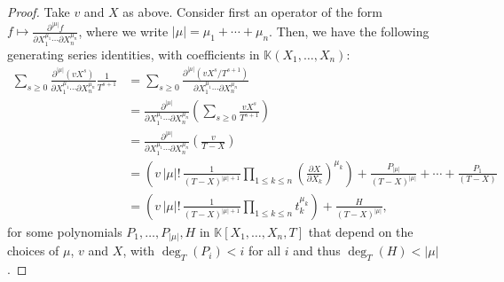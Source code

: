 \documentclass[final,1p,times,authoryear]{elsarticle}
\newcommand{\lf}{X}
\def\K{\mathbb{K}}
\def\K {\ensuremath{\mathbb{K}}}
\begin{document}
\begin{proof}
  Take $v$ and $\lf$ as above. Consider first an operator of the form $f
  \mapsto \frac{ \partial^{|\mu|} f} {\partial X_1^{\mu_1} \cdots
  \partial X_n^{\mu_n}}$, where we write
  $|\mu|=\mu_1+\cdots+\mu_n$. Then, we have the following generating
  series identities, with coefficients in $\K(X_1,\dots,X_n)$:
  \begin{align*}
    \sum_{s \ge 0} 
    \frac{ \partial^{|\mu|} ( v \lf^s )} {\partial X_1^{\mu_1} \cdots
    \partial X_n^{\mu_n}}
    \frac{1}{T^{s+1}} 
    &=  \sum_{s \ge 0} 
    \frac{ \partial^{|\mu|} (v \lf^s/T^{s+1})} {\partial X_1^{\mu_1} \cdots
    \partial X_n^{\mu_n}}\\
    &=  
    \frac{ \partial^{|\mu|} } {\partial X_1^{\mu_1} \cdots
    \partial X_n^{\mu_n}}
    \left (\sum_{s \ge 0} \frac{v \lf^s}{T^{s+1}}\right ) \\
    &= \frac{ \partial^{|\mu|} } {\partial X_1^{\mu_1} \cdots
    \partial X_n^{\mu_n}}
    \left (\frac v{T-\lf} \right ) \\
    &= \left (v\, |\mu|!\,    \frac {1}{(T-\lf)^{|\mu|+1}} \prod_{1 \le k \le n} 
      \left (\frac{ \partial \lf} {\partial X_k} \right)^{\mu_k}
    \right ) + \frac{P_{|\mu|}}{(T-\lf)^{|\mu|}} + \cdots + \frac{P_{1}}{(T-\lf)}\\
    &=\left ( v\, |\mu|!\,    \frac {1}{(T-\lf)^{|\mu|+1}} \prod_{1 \le k \le n} 
      t_k^{\mu_k}
    \right ) + \frac{H}{(T-\lf)^{|\mu|}},
  \end{align*}
  for some polynomials $P_1,\dots,P_{|\mu|},H$ in $\K[X_1,\dots,X_n,T]$ that
  depend on the choices of $\mu$, $v$ and $X$, with $\deg_T(P_i) < i$
  for all $i$ and thus $\deg_T(H) < |\mu|$.


\end{proof}
\end{document}
